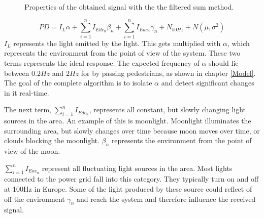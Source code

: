 \begin{figure}
	\centering     %
	\caption{Properties of the obtained signal with the the filtered sum method.\label{Signal_properties}}
\end{figure}

\begin{equation}
\label{eq:Pd_light}
PD = I_{L} \alpha + \sum_{i=1}^n I_{Edc_{n}} \beta_{n} + \sum_{i=1}^n I_{Eac{_n}} \gamma_{n} + N_{50Hz} + N(\mu,\sigma^2)
\end{equation}
$I_{L}$ represents the light emitted by the light. This gets multiplied with $\alpha$, which represents the environment from the point of view of the system. These two terms represents the ideal response. The expected frequency of $\alpha$ should lie between $0.2Hz$ and $2Hz$ for by passing pedestrians, as shown in chapter \ref{Model}. The goal of the complete algorithm is to isolate $\alpha$ and detect significant changes in it real-time.

The next term, $\sum_{i=1}^n I_{Edc_{n}}$, represents all constant, but slowly changing light sources in the area. An example of this is moonlight. Moonlight illuminates the surrounding area, but slowly changes over time because moon moves over time, or clouds blocking the moonlight. $\beta_{n}$ represents the environment from the point of view of the moon.
	
$\sum_{i=1}^n I_{Eac{_n}}$ represent all fluctuating light sources in the area. Most lights connected to the power grid fall into this category. They typically turn on and off at 100Hz in Europe. Some of the light produced by these source could reflect of off the environment $\gamma_{n}$ and reach the system and therefore influence the received signal.

